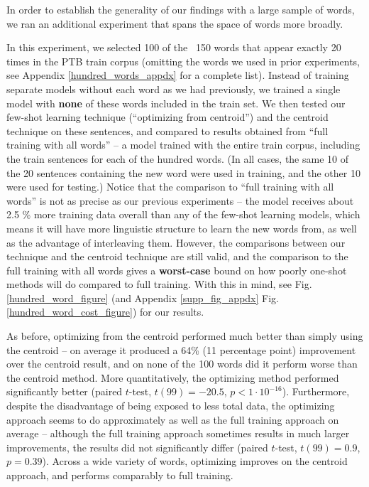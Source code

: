 \documentclass{article}
\begin{document}
In order to establish the generality of our findings with a large sample of words, we ran an additional experiment that spans the space of words more broadly. \par
In this experiment, we selected 100 of the ~150 words that appear exactly 20 times in the PTB train corpus (omitting the words we used in prior experiments, see Appendix \ref{hundred_words_appdx} for a complete list). Instead of training separate models without each word as we had previously, we trained a single model with \textbf{none} of these words included in the train set. We then tested our few-shot learning technique (“optimizing from centroid”) and the centroid technique on these sentences, and compared to results obtained from “full training
with all words” -- a model trained with the entire train corpus, including the train sentences for each of the hundred words. (In all cases, the same 10 of the 20 sentences containing the new word were used in training, and the other 10 were used for testing.) Notice that the comparison to ``full training with all words'' is not as precise as our previous experiments -- the model receives about 2.5 \% more training data overall than any of the few-shot learning models, which means it will have more linguistic structure to learn the new words from, as well as the advantage of interleaving them. However, the comparisons between our technique and the centroid technique are still valid, and the comparison to the full training with all words gives a \textbf{worst-case} bound on how poorly one-shot methods will do compared to full training. With this in mind, see Fig. \ref{hundred_word_figure} (and Appendix \ref{supp_fig_appdx} Fig. \ref{hundred_word_cost_figure}) for our results.\par
As before, optimizing from the centroid performed much better than simply using the centroid -- on average it produced a 64\% (11 percentage point) improvement over the centroid result, and on none of the 100 words did it perform worse than the centroid method. More quantitatively, the optimizing method performed significantly better (paired \(t\)-test, \(t(99) = -20.5\), \(p < 1 \cdot 10^{-16}\)). Furthermore, despite the disadvantage of being exposed to less total data, the optimizing approach seems to do approximately as well as the full training approach on average -- although the full training approach sometimes results in much larger improvements, the results did not significantly differ (paired \(t\)-test, \(t(99)=0.9\), \(p=0.39\)). Across a wide variety of words, optimizing improves on the centroid approach, and performs comparably to full training. \par
\end{document}
